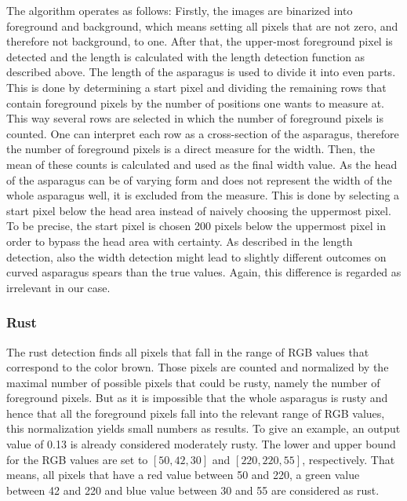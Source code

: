 \bigskip
The algorithm operates as follows: Firstly, the images are binarized into foreground and background, which means setting all pixels that are not zero, and therefore not background, to one. After that, the upper-most foreground pixel is detected and the length is calculated with the length detection function as described above. The length of the asparagus is used to divide it into even parts. This is done by determining a start pixel and dividing the remaining rows that contain foreground pixels by the number of positions one wants to measure at. This way several rows are selected in which the number of foreground pixels is counted. One can interpret each row as a cross-section of the asparagus, therefore the number of foreground pixels is a direct measure for the width. Then, the mean of these counts is calculated and used as the final width value. As the head of the asparagus can be of varying form and does not represent the width of the whole asparagus well, it is excluded from the measure. This is done by selecting a start pixel below the head area instead of naively choosing the uppermost pixel. To be precise, the start pixel is chosen 200 pixels below the uppermost pixel in order to bypass the head area with certainty. As described in the length detection, also the width detection might lead to slightly different outcomes on curved asparagus spears than the true values. Again, this difference is regarded as irrelevant in our case.

\subsubsection{Rust}
\label{subsec:Rust}

The rust detection finds all pixels that fall in the range of RGB values that correspond to the color brown. Those pixels are counted and normalized by the maximal number of possible pixels that could be rusty, namely the number of foreground pixels. But as it is impossible that the whole asparagus is rusty and hence that all the foreground pixels fall into the relevant range of RGB values, this normalization yields small numbers as results. To give an example, an output value of 0.13 is already considered moderately rusty. The lower and upper bound for the RGB values are set to $[50,42,30]$ and $[220,220,55]$, respectively. That means, all pixels that have a red value between 50 and 220, a green value between 42 and 220 and blue value between 30 and 55 are considered as rust.

